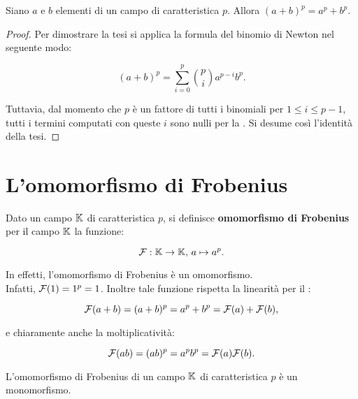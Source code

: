 \documentclass[11pt]{scrbook}
\begin{document}
\begin{theorem}
    \label{th:binomio_ingenuo}
    Siano $a$ e $b$ elementi di un campo di caratteristica $p$. Allora
    $(a+b)^p = a^p + b^p$.
\end{theorem}

\begin{proof}
    Per dimostrare la tesi si applica la formula del binomio di Newton
    nel seguente modo:

    \[ (a+b)^p = \sum_{i=0}^p \binom{p}{i} a^{p-i}b^p. \]

    \vskip 0.1in

    Tuttavia, dal momento che $p$ è un fattore di tutti i binomiali per
    $1 \leq i \leq p-1$, tutti i termini computati con queste $i$
    sono nulli per la .
    Si desume così l'identità della tesi.
\end{proof}

\section{L'omomorfismo di Frobenius}

\begin{definition}
    Dato un campo $\mathbb{K}$ di caratteristica $p$, si definisce
    \textbf{omomorfismo di Frobenius} per il campo $\mathbb{K}$
    la funzione:

    \[ \mathcal{F} : \mathbb{K} \to \mathbb{K},\, a \mapsto a^p. \]
\end{definition}

\begin{remark*}
    In effetti, l'omomorfismo di Frobenius è un omomorfismo. \\

    Infatti, $\mathcal{F}(1) = 1^p = 1$. Inoltre tale funzione
    rispetta la linearità per il :

    \[ \mathcal{F}(a + b) = (a+b)^p = a^p + b^p = \mathcal{F}(a) + \mathcal{F}(b), \]

    \vskip 0.1in

    e chiaramente anche la moltiplicatività:

    \[ \mathcal{F}(ab) = (ab)^p = a^p b^p = \mathcal{F}(a) \mathcal{F}(b). \]
\end{remark*}

\begin{proposition}
    \label{prop:frobenius_monomorfismo}
    L'omomorfismo di Frobenius di un campo $\mathbb{K}$ di caratteristica
    $p$ è un monomorfismo.
\end{proposition}
\end{document}
